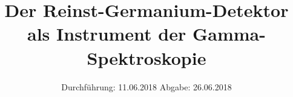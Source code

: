 

\subject{V18}
\title{\texorpdfstring{Der Reinst-Germanium-Detektor als Instrument der 
Gamma-Spektroskopie }{}}
\date{
	Durchführung: 11.06.2018
	\hspace{4em}
	Abgabe: 26.06.2018
}


	\maketitle
	\newpage
	\tableofcontents
	\newpage
	
	
	
	
	
	
	\newpage

	\printbibliography

